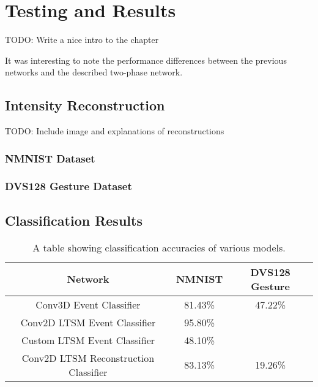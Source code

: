 \chapter{Testing and Results} \label{chap:testing_and_results}

\color{red} TODO: Write a nice intro to the chapter \color{black}

It was interesting to note the performance differences between the previous networks and the described two-phase network.

\section{Intensity Reconstruction}

\color{red} TODO: Include image and explanations of reconstructions \color{black}

\subsection{NMNIST Dataset}

\subsection{DVS128 Gesture Dataset}

\section{Classification Results}

\begin{table}[htb]
    \centering
    \begin{tabular}{|| c | c | c ||}
        \hline
        Network     & NMNIST & DVS128 Gesture \\
        \hline \hline
        Conv3D Event Classifier          & 81.43\%   &   \color{red} 47.22\% \color{black}    \\
        \hline
        Conv2D LTSM Event Classifier         & 95.80\%   &        \\
        \hline
        Custom LTSM Event Classifier         & \color{red} 48.10\% \color{black}   &        \\
        \hline
        Conv2D LTSM Reconstruction Classifier           & \color{red} 83.13\% \color{black}    &    \color{red} 19.26\% \color{black}   \\
        \hline
    \end{tabular}
    \caption{A table showing classification accuracies of various models.}
    \label{tab:network_performances}
\end{table}